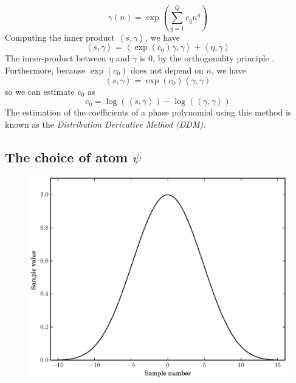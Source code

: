 \[
    \gamma(n) = \exp \left( \sum_{q=1}^{Q} c_q n^{q} \right)
\]
Computing the inner product $\left\langle s , \gamma \right\rangle$, we have
\[
    \left\langle s , \gamma \right\rangle
    =
    \left\langle \exp(c_0) \gamma , \gamma \right\rangle + 
        \left\langle \eta , \gamma \right\rangle
\]
The inner-product between $\eta$ and $\gamma$ is $0$, by the orthogonality
principle \cite[ch.~12]{kay1993fundamentals}. Furthermore, because $\exp(c_0)$ does not
depend on $n$, we have
\[
    \left\langle s , \gamma \right\rangle
    =
    \exp(c_0) \left\langle \gamma , \gamma \right\rangle
\]
so we can estimate $c_0$ as
\begin{equation}
    \label{eq:ddmestc0}
    c_0 = \log \left( \left\langle s , \gamma \right\rangle \right)
        - \log \left( \left\langle \gamma , \gamma \right\rangle \right)
\end{equation}
The estimation of the coefficients of a phase polynomial
using this method is known as the \textit{Distribution Derivative Method (DDM)}.

\subsection{The choice of atom $\psi$ \label{sec:optblackman}}

\begin{figure}[!t]
    \caption{\label{plot:opt_blackman}}
    \centering
    \includegraphics[width=\figwidthscale\textwidth]{plots/min4_blackman_td.eps}
    \CaptionWithTitle{%
    }{}
\end{figure}

